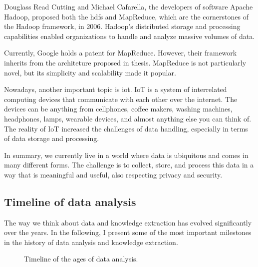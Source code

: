 Douglass Read Cutting and Michael Cafarella, the developers of software Apache Hadoop,
proposed both the \gls{hdfs} and MapReduce, which are the
cornerstones of the Hadoop framework, in 2006.  Hadoop's distributed storage and
processing capabilities enabled organizations to handle and analyze massive volumes of
data.

Currently, Google holds a patent for
MapReduce.
However, their framework inherits from the architeture proposed in
\textcite{Hillis1985} thesis.
MapReduce is not particularly novel, but its simplicity and scalability made it popular.

Nowadays, another important topic is \gls{iot}.  IoT is a system of
interrelated computing devices that communicate with each other over the internet.
The devices can be anything from cellphones, coffee makers, washing machines, headphones,
lamps, wearable devices, and almost anything else you can think of.  The reality of IoT increased the
challenges of data handling, especially in terms of data storage and processing.

In summary, we currently live in a world where data is ubiquitous and comes in many
different forms.  The challenge is to collect, store, and process this data in a way that
is meaningful and useful, also respecting privacy and security.

\subsection{Timeline of data analysis}
\label{sub:time-analysis}

The way we think about data and knowledge extraction has evolved significantly over the
years.  In the following, I present some of the most important milestones in the history
of data analysis and knowledge extraction.

\begin{figure}
  \centering
  \caption{Timeline of the ages of data analysis.}
  \label{fig:data-analysis-history}
\end{figure}

